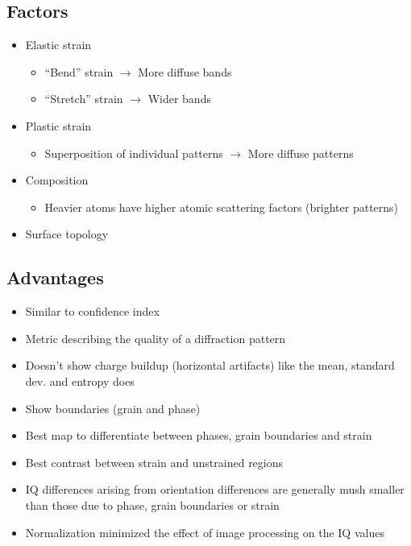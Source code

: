 \documentclass[letterpaper]{article}
\begin{document}
		\subsection{Factors}
			\begin{itemize}
				\item Elastic strain \cite{Wright2006} 
					\begin{itemize}
						\item ``Bend'' strain $\rightarrow$ More diffuse bands
						\item ``Stretch'' strain $\rightarrow$ Wider bands
					\end{itemize}
				\item Plastic strain \cite{Wright2006}
					\begin{itemize}
						\item Superposition of individual patterns $\rightarrow$ More diffuse patterns
					\end{itemize}
				\item Composition \cite{Wright2006}
					\begin{itemize}
						\item Heavier atoms have higher atomic scattering factors (brighter patterns)
					\end{itemize}
				\item Surface topology \cite{Wright2006}
			\end{itemize}
		
		\subsection{Advantages}
			\begin{itemize}
				\item Similar to confidence index \cite{Tao2005}
				\item Metric describing the quality of a diffraction pattern \cite{Wright2006}
				\item Doesn't show charge buildup (horizontal artifacts) like the mean, standard dev. and entropy does \cite{Wright2006}
				\item Show boundaries (grain and phase) \cite{Wright2006}
				\item Best map to differentiate between phases, grain boundaries and strain \cite{Wright2006}
				\item Best contrast between strain and unstrained regions \cite{Wright2006}
				\item IQ differences arising from orientation differences are generally mush smaller than those due to phase, grain boundaries or strain \cite{Wright2006}
				\item Normalization minimized the effect of image processing on the IQ values \cite{Wu2005}
			\end{itemize}
			
\end{document}
